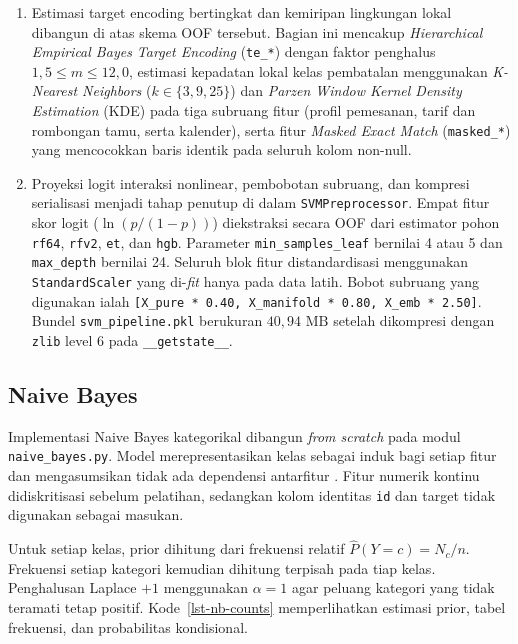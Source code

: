 \begin{enumerate}
    \item Estimasi target encoding bertingkat dan kemiripan lingkungan lokal dibangun di atas skema OOF tersebut. Bagian ini mencakup \textit{Hierarchical Empirical Bayes Target Encoding} (\texttt{te\_*}) dengan faktor penghalus $1{,}5 \le m \le 12{,}0$, estimasi kepadatan lokal kelas pembatalan menggunakan \textit{K-Nearest Neighbors} ($k \in \{3, 9, 25\}$) dan \textit{Parzen Window Kernel Density Estimation} (KDE) pada tiga subruang fitur (profil pemesanan, tarif dan rombongan tamu, serta kalender), serta fitur \textit{Masked Exact Match} (\texttt{masked\_*}) yang mencocokkan baris identik pada seluruh kolom non-null.
    \item Proyeksi logit interaksi nonlinear, pembobotan subruang, dan kompresi serialisasi menjadi tahap penutup di dalam \texttt{SVMPreprocessor}. Empat fitur skor logit ($\ln(p / (1-p))$) diekstraksi secara OOF dari estimator pohon \texttt{rf64}, \texttt{rfv2}, \texttt{et}, dan \texttt{hgb}. Parameter \texttt{min\_samples\_leaf} bernilai 4 atau 5 dan \texttt{max\_depth} bernilai 24. Seluruh blok fitur distandardisasi menggunakan \texttt{StandardScaler} yang di-\textit{fit} hanya pada data latih. Bobot subruang yang digunakan ialah \texttt{[X\_pure * 0.40, X\_manifold * 0.80, X\_emb * 2.50]}. Bundel \texttt{svm\_pipeline.pkl} berukuran $40{,}94\text{ MB}$ setelah dikompresi dengan \texttt{zlib} level $6$ pada \texttt{\_\_getstate\_\_}.
\end{enumerate}

\subsection{Naive Bayes}

Implementasi Naive Bayes kategorikal dibangun \textit{from scratch} pada modul
\texttt{naive\_bayes.py}. Model merepresentasikan kelas sebagai induk bagi
setiap fitur dan mengasumsikan tidak ada dependensi antarfitur
\cite{maulidevi2024bayesnet}. Fitur numerik kontinu didiskritisasi sebelum
pelatihan, sedangkan kolom identitas \texttt{id} dan target tidak digunakan
sebagai masukan.

Untuk setiap kelas, prior dihitung dari frekuensi relatif
$\widehat{P}(Y=c)=N_c/n$. Frekuensi setiap kategori kemudian dihitung
terpisah pada tiap kelas. Penghalusan Laplace $+1$ menggunakan $\alpha=1$
agar peluang kategori yang tidak teramati tetap positif.
Kode~\ref{lst-nb-counts} memperlihatkan estimasi prior, tabel
frekuensi, dan probabilitas kondisional.

